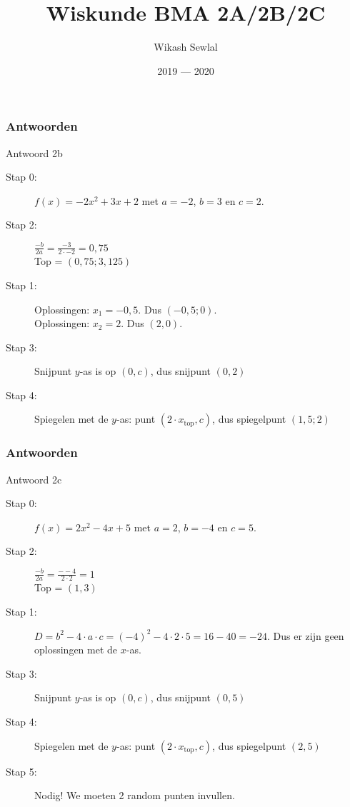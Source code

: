 \documentclass{beamer}
\title{Wiskunde BMA 2A/2B/2C}
\author{Wikash Sewlal}
\institute{Techniek College Rotterdam}
\date{2019 --- 2020}
\begin{document}
\frame{\titlepage}
% 
% 
% 
% 
% 

\begin{frame}
\frametitle{Antwoorden}
\begin{block}{Antwoord 2b}
\begin{description}
 \item[Stap 0:] $f(x) = - 2 x^{2} + 3 x + 2 $ met $a =  -2 $, $b =  3 $ en $c =  2 $.
\item[Stap 2:] $\frac{-b}{2a} = \frac{- 3 }{2 \cdot  -2 } =  0,75$\\
Top = $( 0,75 ; 3,125 )$
\item[Stap 1:]
Oplossingen: $x_1 =  - 0,5$. Dus $(-0,5;0)$.\\
Oplossingen: $x_2 =  2$. Dus $(2,0)$.\\
\item[Stap 3:] Snijpunt $y$-as is op $(0,c)$, dus snijpunt $(0, 2 )$\\
\item[Stap 4:] Spiegelen met de $y$-as: punt $(2 \cdot x_{\text{top}},c)$, dus spiegelpunt $( 1,5 ; 2 )$
\end{description}
\end{block}
\end{frame}

\begin{frame}
\frametitle{Antwoorden}
\begin{block}{Antwoord 2c}
\begin{description}
 \item[Stap 0:] $f(x) = 2 x^{2} - 4 x + 5 $ met $a =  2 $, $b =  -4 $ en $c =  5 $.
\item[Stap 2:] $\frac{-b}{2a} = \frac{- -4 }{2 \cdot  2 } =  1$\\
Top = $( 1, 3 )$
\item[Stap 1:] $D = b^2 - 4 \cdot a \cdot c = (-4)^2 - 4 \cdot 2 \cdot 5 = 16 - 40 = -24$. Dus er zijn geen oplossingen met de $x$-as.
\item[Stap 3:] Snijpunt $y$-as is op $(0,c)$, dus snijpunt $(0, 5 )$\\
\item[Stap 4:] Spiegelen met de $y$-as: punt $(2 \cdot x_{\text{top}},c)$, dus spiegelpunt 
$( 2, 5 )$
\item[Stap 5:] Nodig! We moeten 2 random punten invullen.
\end{description}
\end{block}
\end{frame}
\end{document}
